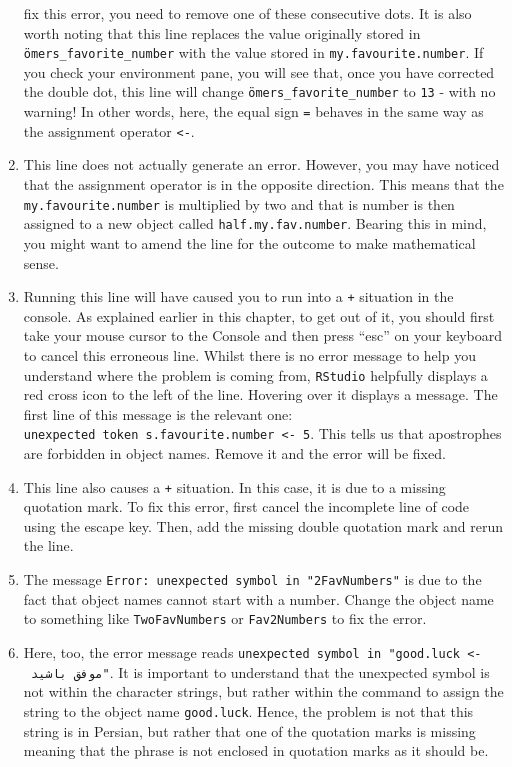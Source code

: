 \documentclass[
  letterpaper,
  DIV=11,
  numbers=noendperiod,
  oneside]{scrreprt}
\begin{document}
\begin{tcolorbox}
\begin{enumerate}
  fix this error, you need to remove one of these consecutive dots. It
  is also worth noting that this line replaces the value originally
  stored in \texttt{ömers\_favorite\_number} with the value stored in
  \texttt{my.favourite.number}. If you check your environment pane, you
  will see that, once you have corrected the double dot, this line will
  change \texttt{ömers\_favorite\_number} to \texttt{13} - with no
  warning! In other words, here, the equal sign \texttt{=} behaves in
  the same way as the assignment operator \texttt{\textless{}-}.
\item
  This line does not actually generate an error. However, you may have
  noticed that the assignment operator is in the opposite direction.
  This means that the \texttt{my.favourite.number} is multiplied by two
  and that is number is then assigned to a new object called
  \texttt{half.my.fav.number}. Bearing this in mind, you might want to
  amend the line for the outcome to make mathematical sense.
\item
  Running this line will have caused you to run into a \texttt{+}
  situation in the console. As explained earlier in this chapter, to get
  out of it, you should first take your mouse cursor to the Console and
  then press ``esc'' on your keyboard to cancel this erroneous line.
  Whilst there is no error message to help you understand where the
  problem is coming from, \texttt{RStudio} helpfully displays a red
  cross icon to the left of the line. Hovering over it displays a
  message. The first line of this message is the relevant one:
  \texttt{unexpected\ token\ \textquotesingle{}s.favourite.number\ \textless{}-\ 5}.
  This tells us that apostrophes are forbidden in object names. Remove
  it and the error will be fixed.
\item
  This line also causes a \texttt{+} situation. In this case, it is due
  to a missing quotation mark. To fix this error, first cancel the
  incomplete line of code using the escape key. Then, add the missing
  double quotation mark and rerun the line.
\item
  The message \texttt{Error:\ unexpected\ symbol\ in\ "2FavNumbers"} is
  due to the fact that object names cannot start with a number. Change
  the object name to something like \texttt{TwoFavNumbers} or
  \texttt{Fav2Numbers} to fix the error.
\item
  Here, too, the error message reads
  \texttt{unexpected\ symbol\ in\ "good.luck\ \textless{}-\ موفق\ باشيد"}.
  It is important to understand that the unexpected symbol is not within
  the character strings, but rather within the command to assign the
  string to the object name \texttt{good.luck}. Hence, the problem is
  not that this string is in Persian, but rather that one of the
  quotation marks is missing meaning that the phrase is not enclosed in
  quotation marks as it should be.
\end{enumerate}

\end{tcolorbox}
\end{document}
